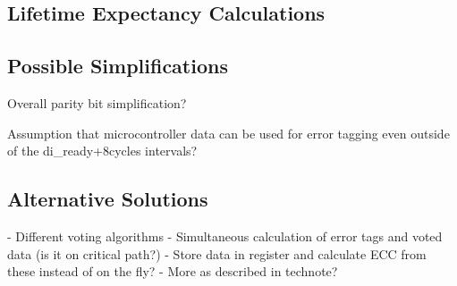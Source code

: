 \subsection{Lifetime Expectancy Calculations}


\subsection{Possible Simplifications}
Overall parity bit simplification?

Assumption that microcontroller data can be used for error tagging
even outside of the di_ready+8cycles intervals?

\subsection{Alternative Solutions}
- Different voting algorithms
- Simultaneous calculation of error tags and voted data (is it on critical path?)
- Store data in register and calculate ECC from these instead of on the fly?
- More as described in technote?